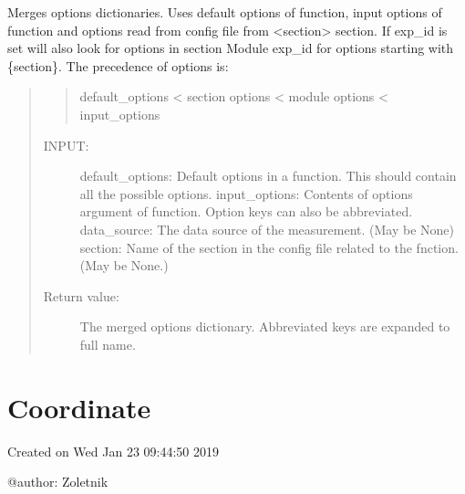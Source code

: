 \documentclass[letterpaper,10pt,english]{sphinxmanual}
\begin{document}

\begin{fulllineitems}
\label{\detokenize{config:flap.config.merge_options}}
Merges options dictionaries. Uses default options of function, input options of function and
options read from config file from \textless{}section\textgreater{} section. If exp\_id is set will also look for options
in section Module exp\_id for options starting with \{section\}.
The precedence of options is:
\begin{quote}
\begin{quote}

default\_options \textless{} section options \textless{} module options \textless{} input\_options
\end{quote}
\begin{description}
\item[{INPUT:}] \leavevmode
default\_options: Default options in a function. This should contain all the possible options.
input\_options: Contents of options argument of function. Option keys can also be abbreviated.
data\_source: The data source of the measurement. (May be None)
section: Name of the section in the config file related to the fnction. (May be None.)

\item[{Return value:}] \leavevmode
The merged options dictionary. Abbreviated keys are expanded to full name.

\end{description}
\end{quote}

\end{fulllineitems}



\section{Coordinate}
\label{\detokenize{coordinate:module-flap.coordinate}}\label{\detokenize{coordinate:coordinate}}\label{\detokenize{coordinate::doc}}
Created on Wed Jan 23 09:44:50 2019

@author: Zoletnik
\end{document}
